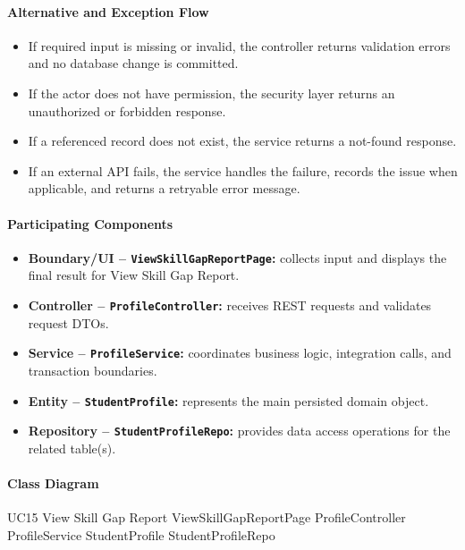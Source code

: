 \paragraph{Alternative and Exception Flow}

\begin{itemize}
    \item If required input is missing or invalid, the controller returns validation errors and no database change is committed.
    \item If the actor does not have permission, the security layer returns an unauthorized or forbidden response.
    \item If a referenced record does not exist, the service returns a not-found response.
    \item If an external API fails, the service handles the failure, records the issue when applicable, and returns a retryable error message.
\end{itemize}

\paragraph{Participating Components}

\begin{itemize}
    \item \textbf{Boundary/UI -- \texttt{ViewSkillGapReportPage}:} collects input and displays the final result for View Skill Gap Report.
    \item \textbf{Controller -- \texttt{ProfileController}:} receives REST requests and validates request DTOs.
    \item \textbf{Service -- \texttt{ProfileService}:} coordinates business logic, integration calls, and transaction boundaries.
    \item \textbf{Entity -- \texttt{StudentProfile}:} represents the main persisted domain object.
    \item \textbf{Repository -- \texttt{StudentProfileRepo}:} provides data access operations for the related table(s).
\end{itemize}

\paragraph{Class Diagram}

\ClassDiagram
{UC15 View Skill Gap Report}
{ViewSkillGapReportPage}
{ProfileController}
{ProfileService}
{StudentProfile}
{StudentProfileRepo}

